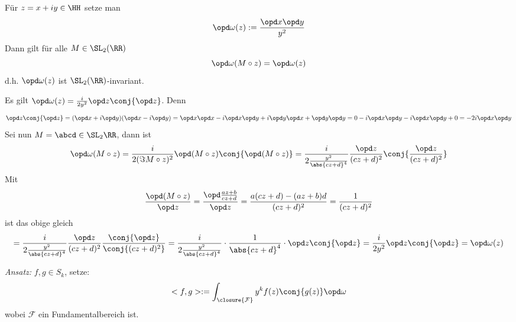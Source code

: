 \begin{defi}
Für $z = x + iy \in \HH$ setze man
\[
\opd \omega(z) := \frac {\opd x \opd y}{y^2}
\]
Dann gilt für alle $M \in \SL_2(\RR)$
\[
\opd \omega(M \circ z) = \opd \omega(z) 
\]
d.h. $\opd \omega(z)$ ist $\SL_2(\RR)$-invariant.
\end{defi}

\begin{bewe}
Es gilt $\opd \omega(z) = \frac {i}{2y^2} \opd z \conj{\opd z}$. Denn
\[
\opd z \conj{\opd z} = (\opd x + i \opd y)(\opd x - i \opd y) = \opd x \opd x - i \opd x \opd y + i \opd y \opd x + \opd y \opd y = 0 - i \opd x \opd y - i \opd x \opd y + 0 = -2i \opd x \opd y
\]
Sei nun $M = \abcd \in \SL_2\RR$, dann ist
\[
\opd \omega(M \circ z) = \frac {i}{2 (\Im M \circ z)^2} \opd (M \circ z) \conj{\opd (M \circ z)} = \frac {i}{2 \frac{y^2}{\abs{cz+d}^4}} \frac{\opd z}{(cz+d)^2} \conj{\frac {\opd z} {(cz+d)^2}}
\]
Mit
\[
\frac {\opd (M \circ z)}{\opd z} = \frac {\opd \frac{az + b}{cz + d}}{\opd z} = \frac {a(cz+d) - (az+b)d}{(cz+d)^2} = \frac{1}{(cz+d)^2}
\]
ist das obige gleich
\[
= \frac {i}{2 \frac{y^2}{\abs{cz+d}^4}} \frac{\opd z}{(cz+d)^2} \frac {\conj{\opd z}} {\conj{(cz+d)^2}} = \frac{i}{2\frac{y^2}{\abs{cz+d}^4}} \cdot \frac {1}{\abs{cz+d}^4} \cdot \opd z \conj{\opd z} = \frac {i}{2y^2} \opd z \conj{\opd z} = \opd \omega(z)
\]
\end{bewe}

\emph{Ansatz:} $f, g \in S_k$, setze:
\[
<f,g> := \int_{\closure{\mathcal F}} y^k f(z) \conj{g(z)} \opd \omega
\]
wobei $\mathcal F$ ein Fundamentalbereich ist.













